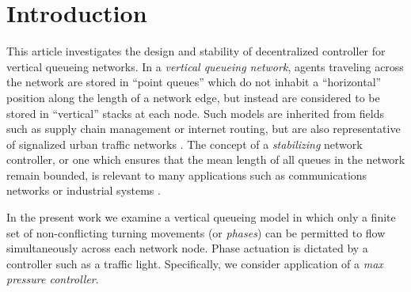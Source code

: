\section{Introduction}

This article investigates the design and stability of decentralized controller for vertical queueing networks. In a \emph{vertical queueing network}, agents traveling across the network are stored in ``point queues'' which do not inhabit a ``horizontal'' position along the length of a network edge, but instead are considered to be stored in ``vertical'' stacks at each node. Such models are inherited from fields such as supply chain management or internet routing, but are also representative of signalized urban traffic networks \cite{Aboudolas2009}\cite{vandenBerg2003}\cite{Zhang2013}.  The concept of a \emph{stabilizing} network controller, or one which ensures that the mean length of all queues in the network remain bounded, is relevant to many applications such as communications networks \cite{Giaccone2005}\cite{Neely2005}\cite{Pajic2013} or industrial systems \cite{Dai2005}\cite{Egerstedt2002}\cite{Brockett1995}\cite{Ishii2001}.

In the present work we examine a vertical queueing model in which only a finite set of non-conflicting turning movements (or \emph{phases}) can be permitted to flow simultaneously across each network node. Phase actuation is dictated by a controller such as a traffic light. Specifically, we consider application of a \emph{max pressure controller}. 

